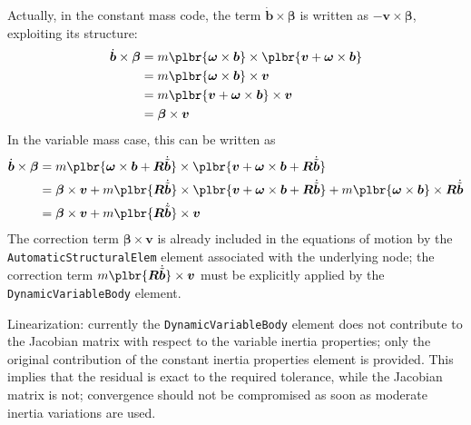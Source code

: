 \documentclass[10pt,fleqn,subeqn]{report}
\newcommand{\T}[1]{\bm{#1}}
\newcommand{\TT}[1]{\bm{#1}}
\begin{document}
Actually, in the constant mass code, the term $\dot{\T{b}} \times \T{\beta}$
is written as $-\T{v}\times\T{\beta}$, exploiting its structure:
\begin{align}
	\dot{\T{b}} \times \T{\beta}
	&=
	m \plbr{\T{\omega} \times \T{b}} \times \plbr{\T{v} + \T{\omega} \times \T{b}}
	\nonumber \\
	&=
	m \plbr{\T{\omega} \times \T{b}} \times \T{v}
	\nonumber \\
	&=
	m \plbr{\T{v} + \T{\omega} \times \T{b}} \times \T{v}
	\nonumber \\
	&=
	\T{\beta} \times \T{v}
\end{align}
In the variable mass case, this can be written as
\begin{align}
	\dot{\T{b}} \times \T{\beta}
	&=
	m \plbr{\T{\omega} \times \T{b} + \TT{R} \dot{\tilde{\T{b}}}} \times
		\plbr{\T{v} + \T{\omega} \times \T{b} + \TT{R} \dot{\tilde{\T{b}}}}
	\nonumber \\
	&=
	\T{\beta} \times \T{v}
	+
	m \plbr{\TT{R} \dot{\tilde{\T{b}}}} \times 
		\plbr{\T{v} + \T{\omega} \times \T{b} + \TT{R} \dot{\tilde{\T{b}}}}
	+
	m \plbr{\T{\omega} \times \T{b}} \times \TT{R} \dot{\tilde{\T{b}}}
	\nonumber \\
	&=
	\T{\beta} \times \T{v}
	+
	m \plbr{\TT{R} \dot{\tilde{\T{b}}}} \times \T{v}
\end{align}
The correction term $\T{\beta} \times \T{v}$ is already included
in the equations of motion by the \texttt{AutomaticStructuralElem}
element associated with the underlying node;
the correction term $m \plbr{\TT{R} \dot{\tilde{\T{b}}}} \times \T{v}$
must be explicitly applied by the \texttt{DynamicVariableBody} element.

\bigskip
Linearization:
currently the \texttt{DynamicVariableBody} element does not contribute
to the Jacobian matrix with respect to the variable inertia properties;
only the original contribution of the constant inertia properties element
is provided.
This implies that the residual is exact to the required tolerance,
while the Jacobian matrix is not; convergence should not be compromised
as soon as moderate inertia variations are used.
\end{document}
